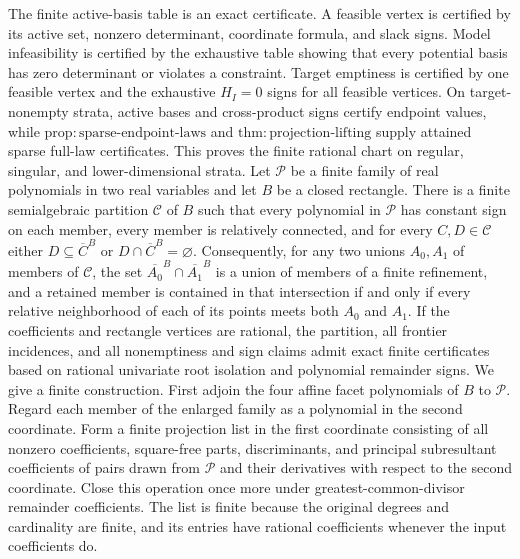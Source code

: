 The finite active-basis table is an exact certificate. A feasible vertex is certified by its active set, nonzero determinant, coordinate formula, and slack signs. Model infeasibility is certified by the exhaustive table showing that every potential basis has zero determinant or violates a constraint. Target emptiness is certified by one feasible vertex and the exhaustive \(H_I=0\) signs for all feasible vertices. On target-nonempty strata, active bases and cross-product signs certify endpoint values, while \(\mathrm{prop:sparse\text{-}endpoint\text{-}laws}\) and \(\mathrm{thm:projection\text{-}lifting}\) supply attained sparse full-law certificates. This proves the finite rational chart on regular, singular, and lower-dimensional strata.
Let \(\mathscr P\) be a finite family of real polynomials in two real variables and let \(B\) be a closed rectangle. There is a finite semialgebraic partition \(\mathscr C\) of \(B\) such that every polynomial in \(\mathscr P\) has constant sign on each member, every member is relatively connected, and for every \(C,D\in\mathscr C\) either \(D\subseteq\overline C^{B}\) or \(D\cap\overline C^{B}=\varnothing\). Consequently, for any two unions \(A_0,A_1\) of members of \(\mathscr C\), the set \(\overline{A_0}^{B}\cap\overline{A_1}^{B}\) is a union of members of a finite refinement, and a retained member is contained in that intersection if and only if every relative neighborhood of each of its points meets both \(A_0\) and \(A_1\). If the coefficients and rectangle vertices are rational, the partition, all frontier incidences, and all nonemptiness and sign claims admit exact finite certificates based on rational univariate root isolation and polynomial remainder signs.
We give a finite construction. First adjoin the four affine facet polynomials of \(B\) to \(\mathscr P\). Regard each member of the enlarged family as a polynomial in the second coordinate. Form a finite projection list in the first coordinate consisting of all nonzero coefficients, square-free parts, discriminants, and principal subresultant coefficients of pairs drawn from \(\mathscr P\) and their derivatives with respect to the second coordinate. Close this operation once more under greatest-common-divisor remainder coefficients. The list is finite because the original degrees and cardinality are finite, and its entries have rational coefficients whenever the input coefficients do.

